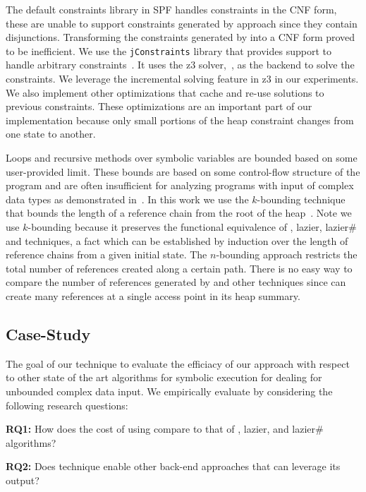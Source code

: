 The default constraints library in SPF handles constraints in the CNF
form, these are unable to support constraints generated by \symtxt{}
approach since they contain disjunctions. Transforming the constraints
generated by \symtxt{} into a CNF form proved to be inefficient. We
use the \texttt{jConstraints} library that provides support to handle
arbitrary constraints~\cite{ase2014-ghilrr,jpf2014-dghirr}. It uses
the z3 solver,~\cite{z3}, as the backend to solve the constraints. We
leverage the incremental solving feature in z3 in our experiments. We
also implement other optimizations that cache and re-use solutions to
previous constraints. These optimizations are an important part of our
implementation because only small portions of the heap constraint
changes from one state to another.


Loops and recursive methods over symbolic variables are bounded based
on some user-provided limit. These bounds are based on some
control-flow structure of the program and are often insufficient for
analyzing programs with input of complex data types as demonstrated
in~\cite{Kiasan07,Deng:2006}. In this work we use the $k$-bounding
technique that bounds the length of a reference chain from the root of
the heap~\cite{Deng:2006}. Note we use $k$-bounding
because it preserves the functional equivalence of \gsetxt{}, lazier,
lazier\# and \symtxt{} techniques, a fact which can be established by
induction over the length of reference chains from a given initial
state. The $n$-bounding approach restricts the total number of
references created along a certain path. There is no easy way to
compare the number of references generated by \symtxt{} and other
techniques since \symtxt{} can create many references at a single
access point in its heap summary.


\subsection{Case-Study} 

The goal of our technique to evaluate the efficiacy of our approach
with respect to other state of the art algorithms for symbolic
execution for dealing for unbounded complex data input. We empirically
evaluate \symtxt{} by considering the following research questions:

\begin{description}
\item {\bf RQ1:} How does the cost of using \symtxt{} compare to that
  of \gsetxt{}, lazier, and lazier\# algorithms?

\item {\bf RQ2:} Does \symtxt{} technique enable other back-end
  approaches that can leverage its output?
\end{description}

